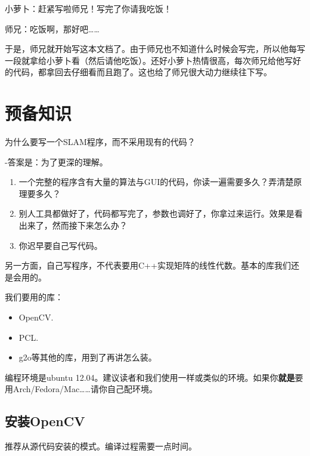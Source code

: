 \documentclass[9pt,a4paper]{article}
\begin{document}
小萝卜：赶紧写啦师兄！写完了你请我吃饭！

师兄：吃饭啊，那好吧……

于是，师兄就开始写这本文档了。由于师兄也不知道什么时候会写完，所以他每写一段就拿给小萝卜看（然后请他吃饭）。还好小萝卜热情很高，每次师兄给他写好的代码，都拿回去仔细看而且跑了。这也给了师兄很大动力继续往下写。

\section{预备知识}
为什么要写一个SLAM程序，而不采用现有的代码？

-答案是：为了更深的理解。

\begin{enumerate}
    \item 一个完整的程序含有大量的算法与GUI的代码，你读一遍需要多久？弄清楚原理要多久？
    \item 别人工具都做好了，代码都写完了，参数也调好了，你拿过来运行。效果是看出来了，然而接下来怎么办？
    \item 你迟早要自己写代码。
\end{enumerate}

另一方面，自己写程序，不代表要用C++实现矩阵的线性代数。基本的库我们还是会用的。

我们要用的库：
\begin{itemize}
    \item OpenCV.
    \item PCL.
    \item g2o等其他的库，用到了再讲怎么装。
\end{itemize}

编程环境是ubuntu 12.04。建议读者和我们使用一样或类似的环境。如果你\textbf{就是}要用Arch/Fedora/Mac……请你自己配环境。

\subsection{安装OpenCV}
推荐从源代码安装的模式。编译过程需要一点时间。
\end{document}
